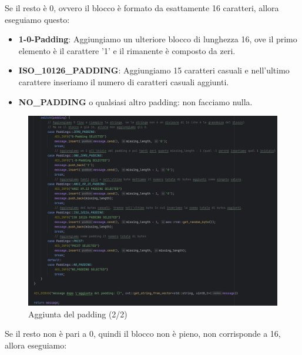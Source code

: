 \textsf{\small Se il resto è 0, ovvero il blocco è formato da esattamente 16 caratteri, allora eseguiamo questo:}

  

\begin{itemize}
	\item \textsf{\small \textbf{1-0-Padding}: Aggiungiamo un ulteriore blocco di lunghezza 16, ove il primo elemento è il carattere '1' e il rimanente è composto da zeri.}
	\item \textsf{\small \textbf{ISO\_10126\_PADDING}: Aggiungiamo 15 caratteri casuali e nell'ultimo carattere inseriamo il numero di caratteri casuali aggiunti.}
	\item \textsf{\small \textbf{NO\_PADDING} o qualsiasi altro padding: non facciamo nulla.}
\end{itemize}

\begin{figure}[H]
	\centering
	\includegraphics[width=1\textwidth, height=1\textheight, keepaspectratio]{./images/code/cpp/padding/add_padding1.PNG}
	\caption{Aggiunta del padding (2/2)}
	\label{fig:add_padding1}
\end{figure}

\textsf{\small Se il resto non è pari a 0, quindi il blocco non è pieno, non corrisponde a 16, allora eseguiamo:}

     

